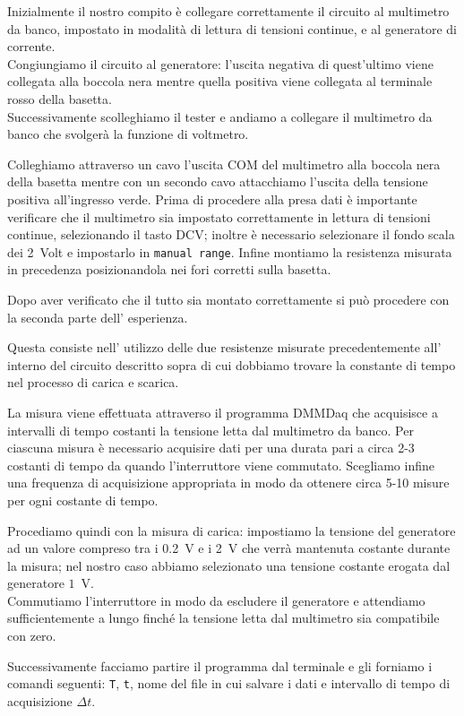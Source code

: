 \documentclass[italian, a4paper, 10pt, twocolumn]{../../style/lab_unige}
\begin{document}
    Inizialmente il nostro compito è collegare correttamente il circuito al multimetro da banco, impostato in modalità di lettura di tensioni continue, e al generatore di corrente.\\
    Congiungiamo il circuito al generatore: l’uscita negativa di quest’ultimo viene collegata alla boccola nera mentre quella positiva viene collegata al terminale rosso della basetta.\\
    Successivamente scolleghiamo il tester e andiamo a collegare il multimetro da banco che svolgerà la funzione di voltmetro.

    Colleghiamo attraverso un cavo l’uscita COM del multimetro alla boccola nera della basetta mentre con un secondo cavo attacchiamo l’uscita della tensione positiva all’ingresso verde. Prima di procedere alla presa dati è importante verificare che il multimetro sia impostato correttamente in lettura di tensioni continue, selezionando il tasto DCV; inoltre è necessario selezionare il fondo scala dei 2~Volt e impostarlo in \verb|manual range|. Infine montiamo la resistenza misurata in precedenza posizionandola nei fori corretti sulla basetta.

    Dopo aver verificato che il tutto sia montato correttamente si può procedere con la seconda parte dell’ esperienza.

    Questa consiste nell’ utilizzo delle due resistenze misurate precedentemente all’ interno del circuito descritto sopra di cui dobbiamo trovare la constante di tempo nel processo di carica e scarica.

    La misura viene effettuata attraverso il programma DMMDaq che acquisisce a intervalli di tempo costanti la tensione letta dal multimetro da banco. Per ciascuna misura è necessario acquisire dati per una durata pari a circa 2-3 costanti di tempo da quando l’interruttore viene commutato.  Scegliamo infine una frequenza di acquisizione appropriata in modo da ottenere circa 5-10 misure per ogni costante di tempo. 

    Procediamo quindi con la misura di carica: impostiamo la tensione del generatore ad un valore compreso tra i 0.2~V e i 2~V che verrà mantenuta costante durante la misura; nel nostro caso abbiamo selezionato una tensione costante erogata dal generatore $1$~V.\\
    Commutiamo l’interruttore in modo da escludere il generatore e attendiamo sufficientemente a lungo finché la tensione letta dal multimetro  sia compatibile con zero. 

    Successivamente facciamo partire il programma dal terminale e gli forniamo i comandi seguenti: \verb|T|, \verb|t|, nome del file in cui salvare i dati e intervallo di tempo di acquisizione $\Delta t$. 
\end{document}

